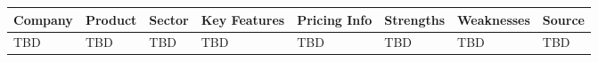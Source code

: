 \begin{longtable}{|p{2cm}|p{2.5cm}|p{1.5cm}|p{2cm}|p{2cm}|p{1.5cm}|p{1.5cm}|p{1.5cm}|}
\hline
\textbf{Company} & \textbf{Product} & \textbf{Sector} & \textbf{Key Features} & \textbf{Pricing Info} & \textbf{Strengths} & \textbf{Weaknesses} & \textbf{Source} \\
\hline
\endhead
\hline
\endfoot
TBD & TBD & TBD & TBD & TBD & TBD & TBD & TBD \\
\end{longtable}

